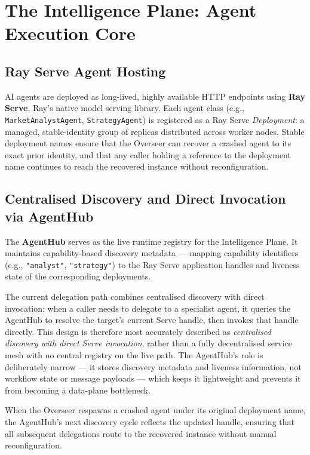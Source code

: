\documentclass[12pt, a4paper]{report}
\begin{document}
\section{The Intelligence Plane: Agent Execution Core}
\label{sec:intelligence_plane}

\subsection{Ray Serve Agent Hosting}
\label{ssec:ray_serve}

AI agents are deployed as long-lived, highly available HTTP endpoints using
\textbf{Ray Serve}, Ray's native model serving library.
Each agent class (e.g., \texttt{MarketAnalystAgent}, \texttt{StrategyAgent}) is
registered as a Ray Serve \emph{Deployment}: a managed, stable-identity group of
replicas distributed across worker nodes.
Stable deployment names ensure that the Overseer can recover a crashed agent to its
exact prior identity, and that any caller holding a reference to the deployment name
continues to reach the recovered instance without reconfiguration.

\subsection{Centralised Discovery and Direct Invocation via AgentHub}
\label{ssec:agenthub}

The \textbf{AgentHub} serves as the live runtime registry for the Intelligence Plane.
It maintains capability-based discovery metadata — mapping capability identifiers
(e.g., \texttt{"analyst"}, \texttt{"strategy"}) to the Ray Serve application handles
and liveness state of the corresponding deployments.

The current delegation path combines centralised discovery with direct invocation:
when a caller needs to delegate to a specialist agent, it queries the AgentHub to
resolve the target's current Serve handle, then invokes that handle directly.
This design is therefore most accurately described as \emph{centralised discovery
with direct Serve invocation}, rather than a fully decentralised service mesh with no
central registry on the live path.
The AgentHub's role is deliberately narrow — it stores discovery metadata and
liveness information, not workflow state or message payloads — which keeps it
lightweight and prevents it from becoming a data-plane bottleneck.

When the Overseer respawns a crashed agent under its original deployment name, the
AgentHub's next discovery cycle reflects the updated handle, ensuring that all
subsequent delegations route to the recovered instance without manual reconfiguration.
\end{document}
